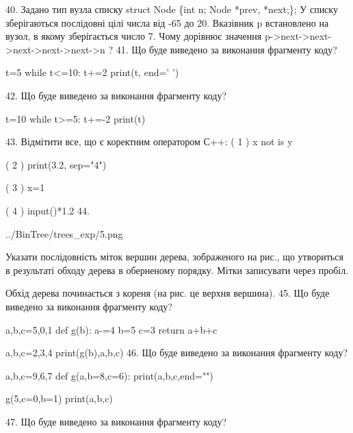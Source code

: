 \documentclass[11pt]{article}
\begin{document}
\vspace{5mm}
40. 
Задано тип вузла списку
struct Node \{int n; Node *prev, *next;\};
У списку зберігаються послідовні цілі числа від -65 до 20. Вказівник p встановлено на вузол, в якому зберігається число 7.
Чому дорівнює значення p->next->next->next->next->next->n ?\vspace{5mm}
41. Що буде виведено за виконання фрагменту коду?

t=5
while t<=10:
    t+=2
print(t, end=' ')

\vspace{5mm}
42. Що буде виведено за виконання фрагменту коду?

t=10
while t>=5:
    t+=-2
print(t)

\vspace{5mm}
43. %
Відмітити все, що є коректним оператором С++:
( 1 ) x not is y

( 2 ) print(3.2, sep="4")

( 3 ) x=1%

( 4 ) input()*1.2
\vspace{5mm}
44. 

\begin{center}
	{../BinTree/trees_exp/5.png}
\end{center}
Указати послідовність міток вершин дерева, зображеного на рис., що утвориться в результаті обходу дерева в оберненому порядку. Мітки записувати через пробіл.\par Обхід дерева починається з кореня (на рис. це верхня вершина).
\vspace{5mm}
45. Що буде виведено за виконання фрагменту коду?

a,b,c=5,0,1
def g(b):
    a-=4
    b=5
    c=3
    return a+b+c

a,b,c=2,3,4
print(g(b),a,b,c)
\vspace{5mm}
46. Що буде виведено за виконання фрагменту коду?

a,b,c=9,6,7
def g(a,b=8,c=6):
    print(a,b,c,end="")

g(5,c=0,b=1)
print(a,b,c)

\vspace{5mm}
47. Що буде виведено за виконання фрагменту коду?
\end{document}
